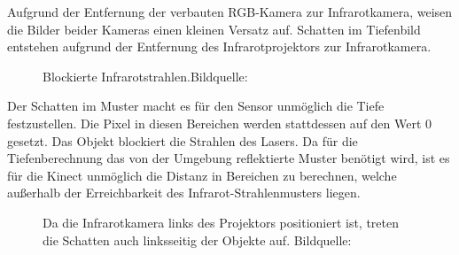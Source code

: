 Aufgrund der Entfernung der verbauten RGB-Kamera zur Infrarotkamera, weisen die Bilder beider Kameras einen kleinen Versatz auf.
Schatten im Tiefenbild entstehen aufgrund der Entfernung des Infrarotprojektors zur Infrarotkamera.


\begin{figure}[!ht]
  \centering
   \caption{Blockierte Infrarotstrahlen.Bildquelle:\cite{kinectdepth}}
\end{figure}
Der Schatten im Muster macht es für den Sensor unmöglich die Tiefe festzustellen. Die Pixel in diesen Bereichen werden stattdessen auf den Wert 0 gesetzt.
Das Objekt blockiert die Strahlen des Lasers. Da für die Tiefenberechnung das von der Umgebung reflektierte Muster benötigt wird, ist es für die Kinect unmöglich die Distanz in Bereichen zu berechnen, welche außerhalb der Erreichbarkeit des Infrarot-Strahlenmusters liegen. 
\begin{figure}[!ht]
  \centering
   \caption{Da die Infrarotkamera links des Projektors positioniert ist, treten die Schatten auch linksseitig der Objekte auf. Bildquelle:\cite{kinectdepth}}
\end{figure}